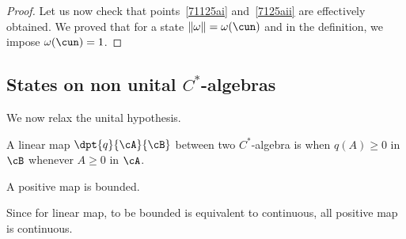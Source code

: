 \begin{proof}
	Let us now check that points~\ref{71125ai} and~\ref{7125aii} are effectively obtained. We proved that for a state $\| \omega \|=\omega(\cun)$ and in the definition, we impose $\omega(\cun)=1$.

\end{proof}

\subsection{States on non unital \texorpdfstring{$C^*$}{C*}-algebras}

We now relax the unital hypothesis.

\begin{definition}  \label{DefApplPositive}
	A linear map $\dpt{q}{\cA}{\cB}$ between two $C^*$-algebra is  when $q(A)\geq 0$ in $\cB$ whenever $A\geq 0$ in $\cA$.
\end{definition}

\begin{proposition}
	A positive map is bounded.\label{prop:posborn}
\end{proposition}

Since for linear map, to be bounded is equivalent to continuous, all positive map is continuous.

